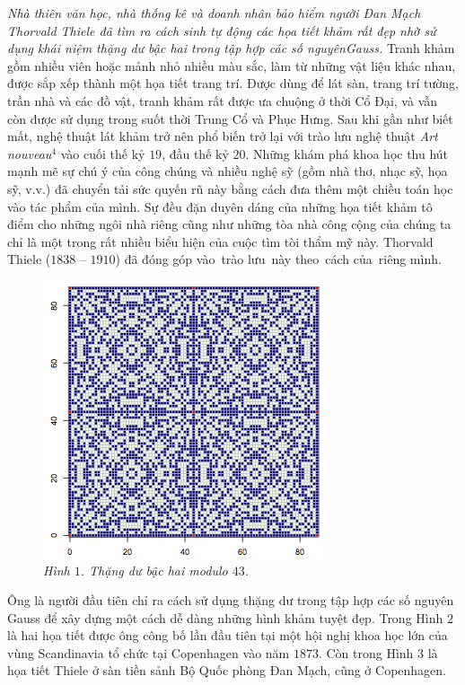 \vspace*{150pt}
\begin{multicols}{2}
	\textit{Nhà thiên văn học, nhà thống kê và doanh nhân bảo hiểm người Đan Mạch Thorvald Thiele đã tìm ra cách sinh tự động các họa tiết khảm rất đẹp nhờ sử dụng khái niệm thặng dư bậc hai trong tập hợp các số nguyên\linebreak Gauss.}
	\vskip 0.1cm
	Tranh khảm gồm nhiều viên hoặc mảnh nhỏ nhiều màu sắc, làm từ những vật liệu khác nhau, được sắp xếp thành một họa tiết trang trí. Được dùng để lát sàn, trang trí tường, trần nhà và các đồ vật, tranh khảm rất được ưa chuộng ở thời Cổ Đại, và vẫn còn được sử dụng trong suốt thời Trung Cổ và Phục Hưng.
	\vskip 0.1cm
	Sau khi gần như biết mất, nghệ thuật lát khảm trở nên phổ biến trở lại với trào lưu nghệ thuật \textit{Art nouveau$^4$}  vào cuối thế kỷ $19$, đầu thế kỷ $20$. Những khám phá khoa học thu hút mạnh mẽ sự chú ý của công chúng và nhiều nghệ sỹ (gồm nhà thơ, nhạc sỹ, họa sỹ, v.v.) đã chuyển tải sức quyến rũ này bằng cách đưa thêm một chiều toán học vào tác phẩm của mình. Sự đều đặn duyên dáng của những họa tiết khảm tô điểm cho những ngôi nhà riêng cũng như những tòa nhà công cộng của chúng ta chỉ là một trong rất nhiều biểu hiện của cuộc tìm tòi thẩm mỹ này.
	\vskip 0.1cm
	Thorvald Thiele ($1838$ -- $1910$) đã đóng góp vào\, trào lưu\, này theo\, cách của\, riêng mình.
	\begin{figure}[H]
		\vspace*{5pt}
		\centering
		\captionsetup{labelformat= empty, justification=centering}
		\includegraphics[width= 0.6\linewidth]{mosaique-1.png}
		\caption{\small\textit{\color{toanhocdoisong}Hình $1$. Thặng dư bậc hai modulo $43$.}}
		\vspace*{-10pt}
	\end{figure}
	Ông là người đầu tiên chỉ ra cách sử dụng thặng dư trong tập hợp các số nguyên Gauss để xây dựng một cách dễ dàng những hình khảm tuyệt đẹp. Trong Hình $2$ là hai họa tiết được ông công bố lần đầu tiên tại một hội nghị khoa học lớn của vùng Scandinavia tổ chức tại Copenhagen vào năm $1873$. Còn trong Hình $3$ là họa tiết Thiele ở sàn tiền sảnh Bộ Quốc phòng Đan Mạch, cũng ở Copenhagen.

\end{multicols}
